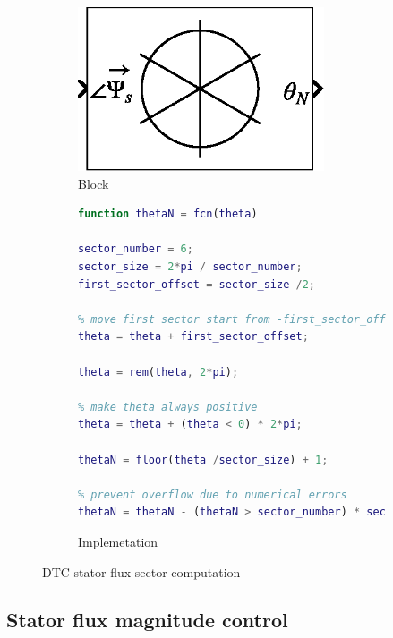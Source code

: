 \begin{figure}[h!]
	\centering
	\begin{subfigure}{.2\textwidth}
		\centering
		\begin{minipage}{.1cm}
			\vfill
		\end{minipage}
		\includegraphics[width=0.8\textwidth]{schematics/sector_compute_block}
		\begin{minipage}{.1cm}
			\vfill
		\end{minipage}
		\caption{Block}
	\end{subfigure}
	\qquad
	\begin{subfigure}{.7\textwidth}
		\begin{lstlisting}[language=matlab]
function thetaN = fcn(theta)

sector_number = 6;
sector_size = 2*pi / sector_number;
first_sector_offset = sector_size /2;

% move first sector start from -first_sector_offset to 0
theta = theta + first_sector_offset;

theta = rem(theta, 2*pi);

% make theta always positive
theta = theta + (theta < 0) * 2*pi;

thetaN = floor(theta /sector_size) + 1;

% prevent overflow due to numerical errors
thetaN = thetaN - (thetaN > sector_number) * sector_number;
		\end{lstlisting}
		\caption{Implemetation}
	\end{subfigure}
	\caption{DTC stator flux sector computation}
	\label{fig:simulink-dtc-flux-sector-schematic}
\end{figure}

\subsection{Stator flux magnitude control}

